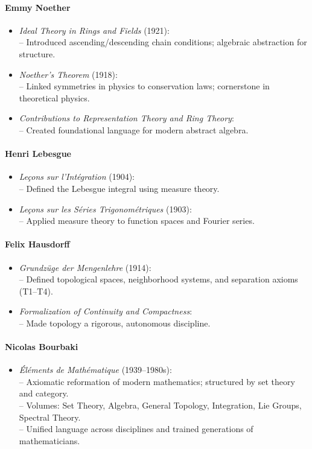 \documentclass[9pt]{article}
\begin{document}
\paragraph{Emmy Noether}
\begin{itemize}
  \item \textit{Ideal Theory in Rings and Fields} (1921): \\
  \quad– Introduced ascending/descending chain conditions; algebraic abstraction for structure.
  \item \textit{Noether’s Theorem} (1918): \\
  \quad– Linked symmetries in physics to conservation laws; cornerstone in theoretical physics.
  \item \textit{Contributions to Representation Theory and Ring Theory}: \\
  \quad– Created foundational language for modern abstract algebra.
\end{itemize}

\paragraph{Henri Lebesgue}
\begin{itemize}
  \item \textit{Leçons sur l’Intégration} (1904): \\
  \quad– Defined the Lebesgue integral using measure theory.
  \item \textit{Leçons sur les Séries Trigonométriques} (1903): \\
  \quad– Applied measure theory to function spaces and Fourier series.
\end{itemize}

\paragraph{Felix Hausdorff}
\begin{itemize}
  \item \textit{Grundzüge der Mengenlehre} (1914): \\
  \quad– Defined topological spaces, neighborhood systems, and separation axioms (T1--T4).
  \item \textit{Formalization of Continuity and Compactness}: \\
  \quad– Made topology a rigorous, autonomous discipline.
\end{itemize}

\paragraph{Nicolas Bourbaki}
\begin{itemize}
  \item \textit{Éléments de Mathématique} (1939--1980s): \\
  \quad– Axiomatic reformation of modern mathematics; structured by set theory and category. \\
  \quad– Volumes: Set Theory, Algebra, General Topology, Integration, Lie Groups, Spectral Theory. \\
  \quad– Unified language across disciplines and trained generations of mathematicians.
\end{itemize}
\end{document}
